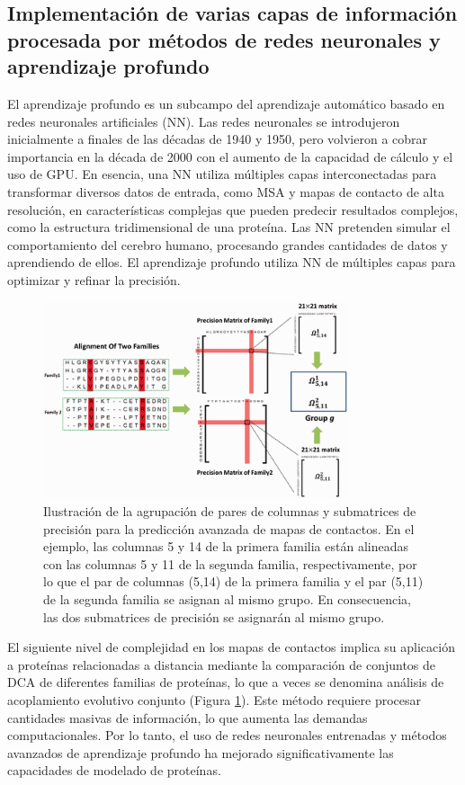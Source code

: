 \subsection{Implementación de varias capas de información procesada por métodos de redes neuronales y aprendizaje profundo}
El aprendizaje profundo es un subcampo del aprendizaje automático basado en redes neuronales artificiales (NN). Las redes neuronales se introdujeron inicialmente a finales de las décadas de 1940 y 1950, pero volvieron a cobrar importancia en la década de 2000 con el aumento de la capacidad de cálculo y el uso de GPU. En esencia, una NN utiliza múltiples capas interconectadas para transformar diversos datos de entrada, como MSA y mapas de contacto de alta resolución, en características complejas que pueden predecir resultados complejos, como la estructura tridimensional de una proteína. Las NN pretenden simular el comportamiento del cerebro humano, procesando grandes cantidades de datos y aprendiendo de ellos. El aprendizaje profundo utiliza NN de múltiples capas para optimizar y refinar la precisión.

\begin{figure}[h]
\centering
\includegraphics[width = 0.8\textwidth]{figs/contact2.png}
\caption{Ilustración de la agrupación de pares de columnas y submatrices de precisión para la predicción avanzada de mapas de contactos. En el ejemplo, las columnas 5 y 14 de la primera familia están alineadas con las columnas 5 y 11 de la segunda familia, respectivamente, por lo que el par de columnas (5,14) de la primera familia y el par (5,11) de la segunda familia se asignan al mismo grupo. En consecuencia, las dos submatrices de precisión se asignarán al mismo grupo.}
\label{fig:contact2}
\end{figure}

El siguiente nivel de complejidad en los mapas de contactos implica su aplicación a proteínas relacionadas a distancia mediante la comparación de conjuntos de DCA de diferentes familias de proteínas, lo que a veces se denomina análisis de acoplamiento evolutivo conjunto (Figura \ref{fig:contact2}). Este método requiere procesar cantidades masivas de información, lo que aumenta las demandas computacionales. Por lo tanto, el uso de redes neuronales entrenadas y métodos avanzados de aprendizaje profundo ha mejorado significativamente las capacidades de modelado de proteínas.

